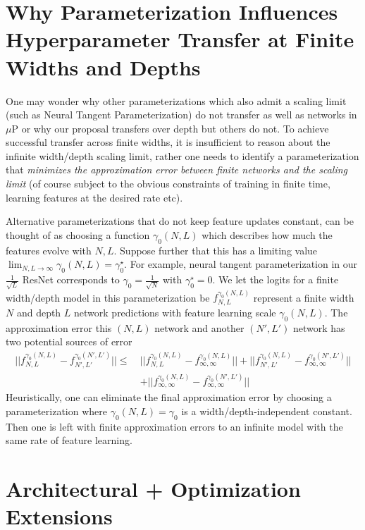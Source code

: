 \documentclass{article} %
\begin{document}
\section{Why Parameterization Influences Hyperparameter Transfer at Finite Widths and Depths}

One may wonder why other parameterizations which also admit a scaling limit (such as Neural Tangent Parameterization) do not transfer as well as networks in $\mu$P or why our proposal transfers over depth but others do not. To achieve successful transfer across finite widths, it is insufficient to reason about the infinite width/depth scaling limit, rather one needs to identify a parameterization that \textit{minimizes the approximation error between finite networks and the scaling limit} (of course subject to the obvious constraints of training in finite time, learning features at the desired rate etc). 

Alternative parameterizations that do not keep feature updates constant, can be thought of as choosing a function $\gamma_0(N,L)$ which describes how much the features evolve with $N, L$. Suppose further that this has a limiting value $\lim_{N, L \to \infty} \gamma_0(N,L) = \gamma_0^\star$. For example, neural tangent parameterization in our $\frac{1}{\sqrt L}$ ResNet corresponds to $\gamma_0 = \frac{1}{\sqrt N}$ with $\gamma_0^\star = 0$. We let the logits for a finite width/depth model in this parameterization be $f^{\gamma_0(N,L)}_{N,L}$ represent a finite width $N$ and depth $L$ network predictions with feature learning scale $\gamma_0(N, L)$. The approximation error this $(N,L)$ network and another $(N',L')$ network has two potential sources of error
\begin{align}
    || f_{N,L}^{\gamma_0(N,L)} - f_{N',L'}^{\gamma_0(N',L')} || \leq \ &|| f_{N,L}^{\gamma_0(N,L)} - f_{\infty, \infty}^{\gamma_0(N,L)} || + || f_{N',L'}^{\gamma_0(N,L)} - f_{\infty,\infty}^{\gamma_0(N',L')} || \nonumber
    \\
    &+ || f_{\infty,\infty}^{\gamma_0(N,L)} -  f_{\infty,\infty}^{\gamma_0(N',L')} ||
\end{align}
Heuristically, one can eliminate the final approximation error by choosing a parameterization where $\gamma_0(N,L) = \gamma_0$ is a width/depth-independent constant. Then one is left with finite approximation errors to an infinite model with the same rate of feature learning. 

\section{Architectural + Optimization Extensions}\label{app:arch_opt_extension}
\end{document}
